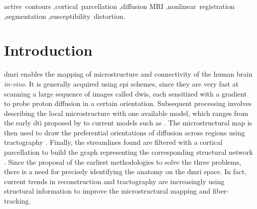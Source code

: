 \documentclass[3p,authoryear,fleqn]{elsarticle}
\begin{document}
\begin{frontmatter}
\begin{keyword}
active~contours \sep cortical~parcellation \sep diffusion MRI \sep nonlinear~registration \sep segmentation \sep susceptibility~distortion.
\end{keyword}

\end{frontmatter}

\linenumbers
\makeatletter{}\section{Introduction}\label{sec:introduction}
\Gls*{dmri} enables the mapping of microstructure \citep{basser_microstructural_1996}
  and connectivity \citep{craddock_imaging_2013} of the human brain \emph{in-vivo}.
It is generally acquired using \gls*{epi} schemes, since they are very fast at
  scanning a large sequence of images called \glspl*{dwi}, each sensitized with
  a gradient to probe proton diffusion in a certain orientation.
Subsequent processing involves describing the local microstructure with one available
  model, which ranges from the early \gls*{dti} proposed by \cite{basser_microstructural_1996}
  to current models such as \citep{daducci_accelerated_2015}.
The microstructural map is then used to draw the preferential orientations of diffusion
  across regions using tractography \citep{mori_threedimensional_1999}.
Finally, the streamlines found are filtered with a cortical parcellation
  to build the graph representing the corresponding structural
  network \citep{hagmann_mapping_2008}.
Since the proposal of the earliest methodologies to solve the three problems,
  there is a need for precisely identifying the anatomy on the \gls*{dmri} space.
In fact, current trends in reconstruction \citep{jeurissen_multitissue_2014} and
  tractography \citep{smith_anatomicallyconstrained_2012} are increasingly using
  structural information to improve the microstructural mapping and fiber-tracking.
\end{document}

